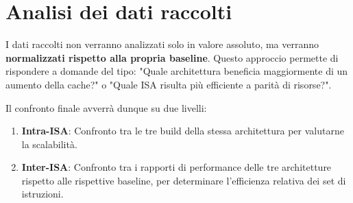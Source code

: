 \documentclass[../../main_document/main.tex]{subfiles}
\begin{document}
\section{Analisi dei dati raccolti}
I dati raccolti non verranno analizzati solo in valore assoluto, ma verranno \textbf{normalizzati rispetto alla propria baseline}. Questo approccio permette di rispondere a domande del tipo: "Quale architettura beneficia maggiormente di un aumento della cache?" o "Quale ISA risulta più efficiente a parità di risorse?". 

\vspace{8pt}
\noindent
Il confronto finale avverrà dunque su due livelli:
\begin{enumerate}[leftmargin=1em]
    \item \textbf{Intra-ISA}: Confronto tra le tre build della stessa architettura per valutarne la scalabilità.
    \item \textbf{Inter-ISA}: Confronto tra i rapporti di performance delle tre architetture rispetto alle rispettive baseline, per determinare l'efficienza relativa dei set di istruzioni.
\end{enumerate}
\end{document}

